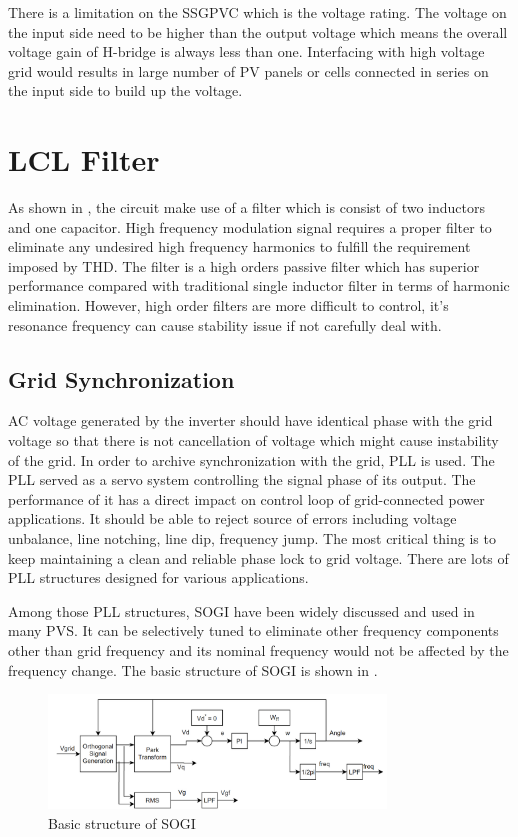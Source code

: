 There is a limitation on the \gls{SSGPVC} which is the voltage rating. The voltage on the input side need to be higher than the output voltage which means the overall voltage gain of H-bridge is always less than one. Interfacing with high voltage grid would results in large number of \gls{PV} panels or cells connected in series on the input side to build up the voltage. 

\section{LCL Filter}

As shown in , the circuit make use of a filter which is consist of two inductors and one capacitor. High frequency modulation signal requires a proper filter to eliminate any undesired high frequency harmonics to fulfill the requirement imposed by THD. The filter is a high orders passive filter which has superior performance compared with traditional single inductor filter in terms of harmonic elimination. However, high order filters are more difficult to control, it's resonance frequency can cause stability issue if not carefully deal with\cite{RN15}.

\subsection{Grid Synchronization}
\gls{AC} voltage generated by the inverter should have identical phase with the grid voltage so that there is not cancellation of voltage which might cause instability of the grid. In order to archive synchronization with the grid, \gls{PLL} is used. The \gls{PLL} served as a servo system controlling the signal phase of its output. The performance of it has a direct impact on control loop of grid-connected power applications. It should be able to reject source of errors including voltage unbalance, line notching, line dip, frequency jump. The most critical thing is to keep maintaining a clean and reliable phase lock to grid voltage. There are lots of \gls{PLL} structures designed for various applications. 

Among those \gls{PLL} structures, \gls{SOGI} have been widely discussed and used in many \gls{PVS}. It can be selectively tuned to eliminate other frequency components other than grid frequency and its nominal frequency would not be affected by the frequency change\cite{RN21}. The basic structure of \gls{SOGI} is shown in .
\begin{figure}[t]
     \centering
     \includegraphics[width = 0.8\textwidth]{figures/SOGI.png}
     \caption{Basic structure of SOGI}
     \label{fig:SOGI}
\end{figure}

